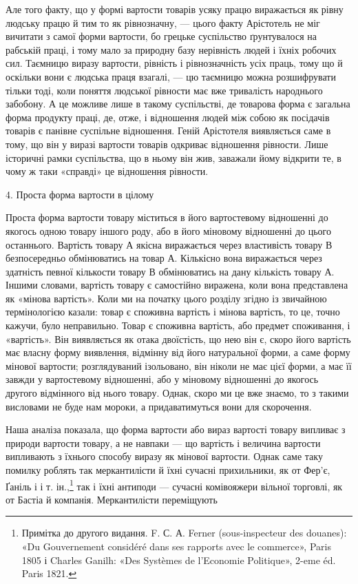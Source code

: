 Але того факту, що у формі вартости товарів усяку працю виражається
як рівну людську працю й тим то як рівнозначну, —
цього факту Арістотель не міг вичитати з самої форми вартости,
бо грецьке суспільство ґрунтувалося на рабській праці, і тому
мало за природну базу нерівність людей і їхніх робочих сил.
Таємницю виразу вартости, рівність і рівнозначність усіх праць,
тому що й оскільки вони є людська праця взагалі, — цю таємницю
можна розшифрувати тільки тоді, коли поняття людської рівности
має вже тривалість народнього забобону. А це можливе лише в
такому суспільстві, де товарова форма є загальна форма продукту
праці, де, отже, і відношення людей між собою як посідачів товарів
є панівне суспільне відношення. Геній Арістотеля виявляється
саме в тому, що він у виразі вартости товарів одкриває відношення
рівности. Лише історичні рамки суспільства, що в ньому він жив,
заважали йому відкрити те, в чому ж таки «справді» це відношення
рівности.

4. Проста форма вартости в цілому

Проста форма вартости товару міститься в його вартостевому
відношенні до якогось одною товару іншого роду, або в його міновому
відношенні до цього останнього. Вартість товару А якісна
виражається через властивість товару В безпосередньо обмінюватись
на товар А. Кількісно вона виражається через здатність
певної кількости товару В обмінюватись на дану кількість товару
А. Іншими словами, вартість товару є самостійно виражена, коли
вона представлена як «мінова вартість». Коли ми на початку цього
розділу згідно із звичайною термінологією казали: товар є споживна
вартість і мінова вартість, то це, точно кажучи, було неправильно.
Товар є споживна вартість, або предмет споживання, і
«вартість». Він виявляється як отака двоїстість, що нею він є,
скоро його вартість має власну форму виявлення, відмінну від
його натуральної форми, а саме форму мінової вартости; розглядуваний
ізольовано, він ніколи не має цієї форми, а має її завжди
у вартостевому відношенні, або у міновому відношенні до якогось
другого відмінного від нього товару. Однак, скоро ми це вже
знаємо, то з такими висловами не буде нам мороки, а придаватимуться
вони для скорочення.

Наша аналіза показала, що форма вартости або вираз вартості
товару випливає з природи вартости товару, а не навпаки — що
вартість і величина вартости випливають з їхнього способу виразу
як мінової вартости. Однак саме таку помилку роблять так меркантилісти
й їхні сучасні прихильники, як от Фер’є, Ґаніль і
і т. ін.,\footnote{
Примітка до другого видання. F. С. А. Ferner (sous-inspecteur
des douanes): «Du Gouvernement considéré dans ses rapports avec
le commerce», Paris 1805 і Charles Ganilh: «Des Systèmes de l’Economie
Politique», 2-eme éd. Paris 1821.
} так і їхні антиподи — сучасні комівояжери вільної торговлі,
як от Бастіа й компанія. Меркантилісти переміщують
\parbreak{}  %
